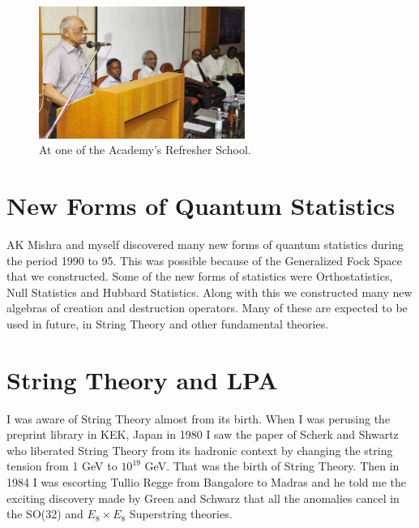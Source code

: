 \begin{figure}[h]
\centering
\includegraphics[width=0.6\textwidth]{images/Rajaji-outreach-1.jpg}
\caption{\small{At one of the Academy's Refresher School.}}

\vspace{-.3cm}

\end{figure}

\vspace{-.5cm}

\section*{New Forms of Quantum Statistics}

\vspace{-.2cm}

AK Mishra and myself discovered many new forms of quantum statistics during
the period 1990 to 95. This was possible because of the Generalized Fock Space
that we constructed. Some of the new forms of statistics were Orthostatistics, 
Null Statistics and Hubbard Statistics. Along with this we constructed many
new algebras of creation and destruction operators. Many of these are expected
to be used in future, in String Theory and other fundamental theories.

\vspace{-.3cm}

\section*{String Theory and LPA}

\vspace{-.2cm}

I was aware of String Theory almost from its birth. When I was perusing 
the preprint library in KEK, Japan in 1980 I saw the paper of Scherk and 
Shwartz who liberated String Theory from its hadronic context by 
changing the string tension from 1 GeV to $10^{19}$ GeV. That was the birth 
of String Theory. Then in 1984 I was escorting Tullio Regge from 
Bangalore to Madras and he told me the exciting discovery made by Green 
and Schwarz that all the anomalies cancel in the SO(32) and $E_8 \times E_8$ 
Superstring theories.

